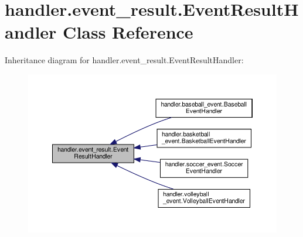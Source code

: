 \hypertarget{classhandler_1_1event__result_1_1_event_result_handler}{}\section{handler.\+event\+\_\+result.\+Event\+Result\+Handler Class Reference}
\label{classhandler_1_1event__result_1_1_event_result_handler}


Inheritance diagram for handler.\+event\+\_\+result.\+Event\+Result\+Handler\+:\nopagebreak
\begin{figure}[H]
\begin{center}
\leavevmode
\includegraphics[width=350pt]{classhandler_1_1event__result_1_1_event_result_handler__inherit__graph}
\end{center}
\end{figure}

